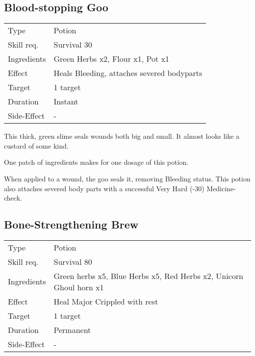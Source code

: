 \documentclass[11pt,a4paper,twocolumn]{book}
\begin{document}
\subsection*{Blood-stopping Goo}
{
	\begin{tabu} to 75mm{| X[l,4] | X[l,8] |}
		\hline
		Type 			& Potion 												\\
		Skill req.	    & Survival 30 									\\
		Ingredients     & Green Herbs x2, Flour x1, Pot x1						\\
		Effect     		& Heals Bleeding, attaches severed bodyparts 			\\
		Target      	& 1 target												\\
		Duration  		& Instant	 											\\
		Side-Effect     & -														\\ \hline
	\end{tabu}
	
}

\medskip

This thick, green slime seals wounds both big and small. It almost looks like a custard of some kind.

One patch of ingredients makes for one dosage of this potion.

When applied to a wound, the goo seals it, removing Bleeding status. This potion also attaches severed body parts with a successful Very Hard (-30) Medicine-check.


\subsection*{Bone-Strengthening Brew}
{
	\begin{tabu} to 75mm{| X[l,4] | X[l,8] |}
		\hline
		Type 			& Potion 																\\
		Skill req.	    & Survival 80 															\\
		Ingredients     & Green herbs x5, Blue Herbs x5, Red Herbs x2, Unicorn Ghoul horn x1	\\
		Effect     		& Heal Major Crippled with rest											\\
		Target      	& 1 target																\\
		Duration  		& Permanent	 															\\
		Side-Effect     & -																		\\ \hline
	\end{tabu}
	
}
\end{document}
